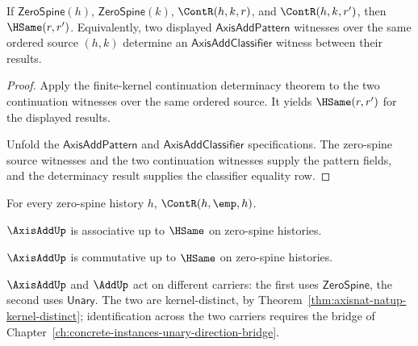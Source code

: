 \begin{theorem}
\label{thm:axisadd-result-determinacy}
If $\mathsf{ZeroSpine}(h)$, $\mathsf{ZeroSpine}(k)$, $\ContR(h, k, r)$, and $\ContR(h, k, r')$, then $\HSame(r, r')$. Equivalently, two displayed $\mathsf{AxisAddPattern}$ witnesses over the same ordered source $(h, k)$ determine an $\mathsf{AxisAddClassifier}$ witness between their results.
\end{theorem}
\begin{proof}
Apply the finite-kernel continuation determinacy theorem to the two continuation witnesses over the same ordered source. It yields $\HSame(r, r')$ for the displayed results.

Unfold the $\mathsf{AxisAddPattern}$ and $\mathsf{AxisAddClassifier}$ specifications. The zero-spine source witnesses and the two continuation witnesses supply the pattern fields, and the determinacy result supplies the classifier equality row.
\end{proof}

\begin{theorem}
\label{thm:axisadd-right-unit}
For every zero-spine history \(h\), \(\ContR(h, \emp, h)\).
\end{theorem}

\begin{theorem}
\label{thm:axisadd-associativity}
\(\AxisAddUp\) is associative up to \(\HSame\) on zero-spine histories.
\end{theorem}

\begin{theorem}
\label{thm:axisadd-commutativity}
\(\AxisAddUp\) is commutative up to \(\HSame\) on zero-spine histories.
\end{theorem}

\begin{remark}
\(\AxisAddUp\) and \(\AddUp\) act on different carriers: the first uses \(\mathsf{ZeroSpine}\), the second uses \(\mathsf{Unary}\). The two are kernel-distinct, by Theorem~\ref{thm:axisnat-natup-kernel-distinct}; identification across the two carriers requires the bridge of Chapter~\ref{ch:concrete-instances-unary-direction-bridge}.
\end{remark}

